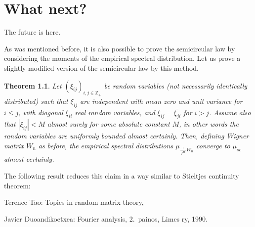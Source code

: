 \documentclass[12pt,a4paper,leqno]{report}
\newcommand{\Z}{\mathbb{Z}}
\theoremstyle{plain}
\newtheorem{theo}[equation]{Theorem}
\theoremstyle{definition}
\theoremstyle{remark}
\begin{document}
\chapter{What next?}\label{future}

The future is here.

As was mentioned before, it is also possible to prove the semicircular law by considering the moments of the empirical spectral distribution. Let us prove a slightly modified version of the semicircular law by this method.

\begin{theo}
Let $(\xi_{ij})_{i,j \in \Z_+}$ be random variables (not necessarily identically distributed) such that $\xi_{ij}$
are independent with mean zero and unit variance for $i \leq j$, with diagonal $\xi_{ii}$ real random variables, and $\xi_{ij}=\overline{\xi_{ji}}$ for $i>j$. Assume also that $|\xi_{ij}|<M$ almost surely for some absolute constant $M$, in other words the random variables are uniformly bounded almost certainly.
Then, defining Wigner matrix $W_n$ as before, the empirical spectral distributions $\mu_{\frac{1}{\sqrt{n}}W_n}$ converge to $\mu_{sc}$ almost certainly.
\end{theo}

The following result reduces this claim in a way similar to Stieltjes continuity theorem:

\begin{thebibliography}{9}

Terence Tao: Topics in random matrix theory, 

Javier Duoandikoetxea: Fourier analysis, 2.\ painos, Limes ry, 1990.

\end{thebibliography}
\end{document}
